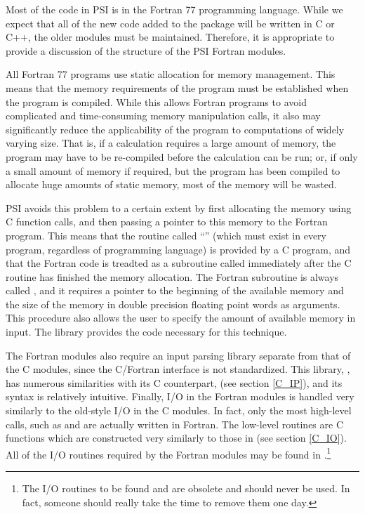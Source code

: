 %
%
%
%
Most of the code in PSI is in the Fortran 77 programming language.  While we
expect that all of the new code added to the package will be written
in C or C++, the older modules must be maintained.  Therefore, it is
appropriate to provide a discussion of the structure of the PSI Fortran
modules.

All Fortran 77 programs use static allocation for memory management.  This
means that the memory requirements of the program must be established when
the program is compiled.  While this allows Fortran programs to avoid
complicated and time-consuming memory manipulation calls, it also may
significantly reduce the applicability of the program to computations of
widely varying size.  That is, if a calculation requires a large amount of
memory, the program may have to be re-compiled before the calculation can
be run; or, if only a small amount of memory if required, but the program
has been compiled to allocate huge amounts of static memory, most of the
memory will be wasted.

PSI avoids this problem to a certain extent by first allocating the memory
using C function calls, and then passing a pointer to this memory to the
Fortran program.  This means that the routine called ``'' (which
must exist in every program, regardless of programming language) is
provided by a C program, and that the Fortran code is treadted as a
subroutine called immediately after the C routine has finished the memory
allocation.  The Fortran subroutine is always called , and it
requires a pointer to the beginning of the available memory and the size of
the memory in double precision floating point words as arguments.  This
procedure also allows the user to specify the amount of available memory in
input.  The  library provides the code necessary for this
technique.

The Fortran modules also require an input parsing library separate from
that of the C modules, since the C/Fortran interface is not standardized.
This library, , has numerous similarities with its C
counterpart,  (see section \ref{C_IP}), and its syntax is
relatively intuitive.  Finally, I/O in the Fortran modules is handled very
similarly to the old-style I/O in the C modules.  In fact, only the most high-level
calls, such as  and  are actually written in
Fortran.  The low-level routines are C functions which are constructed very
similarly to those in  (see section \ref{C_IO}).  All of
the I/O routines required by the Fortran modules may be found in .\footnote{The I/O routines to be found  and  are obsolete and should never be used.  In fact, someone should
really take the time to remove them one day.}

